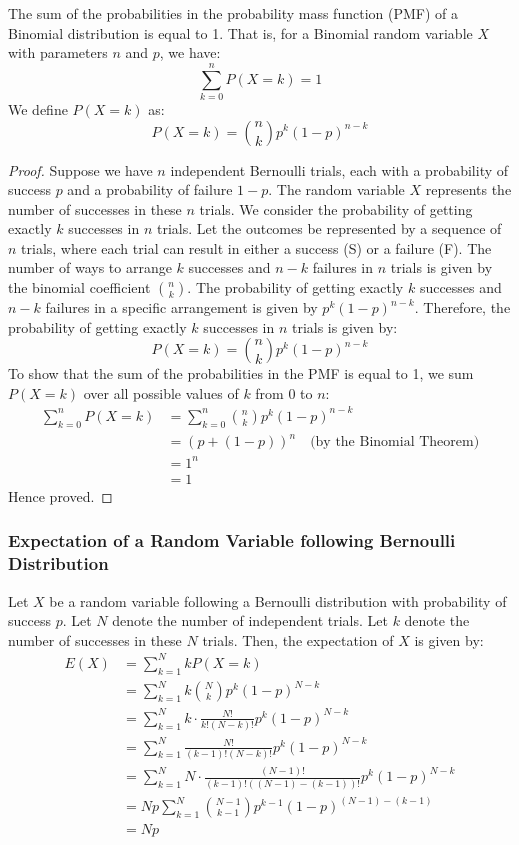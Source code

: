 \documentclass[openany]{book}
\begin{document}
\begin{mytheorem}
    The sum of the probabilities in the probability mass function (PMF) of a Binomial distribution is equal to 1. That is, for a Binomial random variable $X$ with parameters $n$ and $p$, we have:
    $$\sum_{k=0}^{n} P(X = k) = 1$$
    We define $P(X = k)$ as:
    $$P(X = k) = \binom{n}{k} p^k (1 - p)^{n - k}$$
\end{mytheorem}
\begin{proof}
    Suppose we have $n$ independent Bernoulli trials, each with a probability of success $p$ and a probability of failure $1 - p$. The random variable $X$ represents the number of successes in these $n$ trials. We consider the probability of getting exactly $k$ successes in $n$ trials. Let the outcomes be represented by a sequence of $n$ trials, where each trial can result in either a success (S) or a failure (F). The number of ways to arrange $k$ successes and $n - k$ failures in $n$ trials is given by the binomial coefficient $\binom{n}{k}$. The probability of getting exactly $k$ successes and $n - k$ failures in a specific arrangement is given by $p^k (1 - p)^{n - k}$. Therefore, the probability of getting exactly $k$ successes in $n$ trials is given by:
    $$P(X = k) = \binom{n}{k} p^k (1 - p)^{n - k}$$
    To show that the sum of the probabilities in the PMF is equal to 1, we sum $P(X = k)$ over all possible values of $k$ from 0 to $n$:
    \begin{align*}
        \sum_{k=0}^{n} P(X = k) &= \sum_{k=0}^{n} \binom{n}{k} p^k (1 - p)^{n - k} \\
        &= (p + (1 - p))^n \quad \text{(by the Binomial Theorem)} \\
        &= 1^n \\
        &= 1
    \end{align*}
    Hence proved.
\end{proof}

\subsubsection{Expectation of a Random Variable following Bernoulli Distribution}
Let $X$ be a random variable following a Bernoulli distribution with probability of success $p$. Let $N$ denote the number of independent trials. Let $k$ denote the number of successes in these $N$ trials. Then, the expectation of $X$ is given by:
\begin{align*}
    E(X) &= \sum_{k=1}^{N} k P(X = k) \\
    &= \sum_{k=1}^{N} k \binom{N}{k} p^k (1 - p)^{N - k} \\
    &= \sum_{k=1}^{N} k\cdot \frac{N!}{k!(N-k)!} p^k (1 - p)^{N - k} \\
    &= \sum_{k=1}^{N} \frac{N!}{(k-1)!(N-k)!} p^k (1 - p)^{N - k} \\
    &= \sum_{k=1}^{N} N \cdot \frac{(N-1)!}{(k-1)!((N-1)-(k-1))!} p^k (1 - p)^{N - k} \\
    &= Np \sum_{k=1}^{N} \binom{N-1}{k-1} p^{k-1} (1 - p)^{(N-1) - (k-1)} \\
    &= Np
\end{align*}
\end{document}
